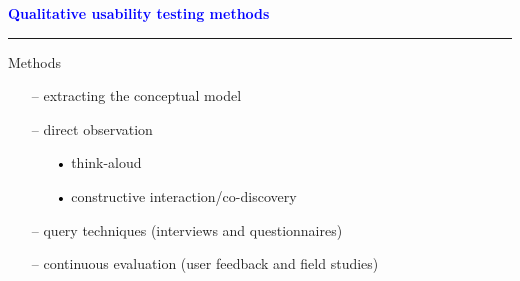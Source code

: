 \documentclass[pdf]{beamer}
\begin{document}
{%
{
\begin{frame}
    \textcolor{Blue}{\textbf{\Large{Qualitative usability testing methods}}}
    \textcolor{red}{\rule{10cm}{1mm}}
    Methods\par
    \begin{itemize}
        \item[\textcolor{black}{--}] extracting the conceptual model
        \item[\textcolor{black}{--}] direct observation
        \begin{itemize}
    		\item[\textcolor{black}{•}] think-aloud
        	\item[\textcolor{black}{•}] constructive interaction/co-discovery
        \end{itemize}
        \item[\textcolor{black}{--}] query techniques (interviews and questionnaires)
        \item[\textcolor{black}{--}] continuous evaluation (user feedback and field studies)
    \end{itemize}
\end{frame}}



}
\end{document}
